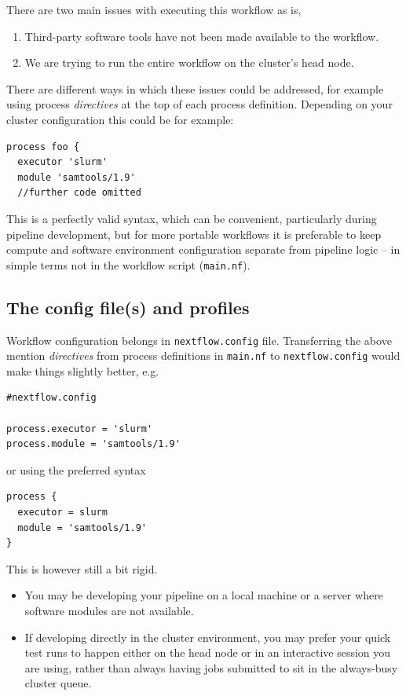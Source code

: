 There are two main issues with executing this workflow as is, 
\begin{enumerate}
 \item Third-party software tools have not been made available to the workflow.
 \item We are trying to run the entire workflow on the cluster's head node.
\end{enumerate}

There are different ways in which these issues could be addressed, for example using process 
\emph{directives} at the top of each process definition. 
Depending on your cluster configuration this could be for example:
\begin{lstlisting}
process foo {
  executor 'slurm' 
  module 'samtools/1.9' 
  //further code omitted 
\end{lstlisting}

This is a perfectly valid syntax, which can be convenient, particularly during pipeline development, 
but for more portable workflows it is preferable to keep compute and software environment configuration 
separate from pipeline logic -- in simple terms not in the workflow script (\texttt{main.nf}).

\subsection{The config file(s) and profiles}

Workflow configuration belongs in \texttt{nextflow.config} file. 
Transferring the above mention \emph{directives} from process definitions in \texttt{main.nf} 
to \texttt{nextflow.config} would make things slightly better, e.g.

\begin{lstlisting}
#nextflow.config

process.executor = 'slurm' 
process.module = 'samtools/1.9' 
\end{lstlisting}

or using the preferred syntax

\begin{lstlisting}
process {
  executor = slurm
  module = 'samtools/1.9'
}
\end{lstlisting}


This is however still a bit rigid. 
\begin{itemize}
\item You may be developing your pipeline on a local machine or a server where software modules are not available. 
\item If developing directly in the cluster environment, you may prefer your quick test runs to happen either on the head node or in an interactive session you are using, rather than always having jobs submitted to sit in the always-busy cluster queue.
\end{itemize}



